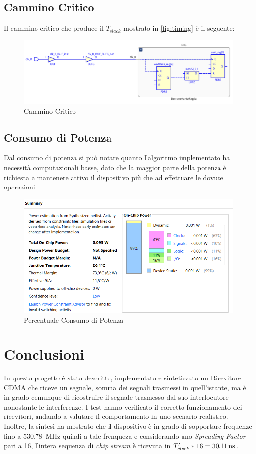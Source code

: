\documentclass[a4paper,12pt]{article}
\begin{document}
  \subsection{Cammino Critico}
    Il cammino critico che produce il $T_{slack}$ mostrato in \ref{fig:timing} è il seguente:
    \begin{figure}[H]
      \centering
      \includegraphics[width=\textwidth]{img/CamminoCritico.png}
      \caption{Cammino Critico}
      \label{fig:critico}
    \end{figure}
  \subsection{Consumo di Potenza}
    Dal consumo di potenza si può notare quanto l'algoritmo implementato ha necessità computazionali basse, dato che la 
    maggior parte della potenza è richiesta a mantenere attivo il dispositivo più che ad effettuare le dovute operazioni.
    \begin{figure}[H]
      \centering
      \includegraphics[width=\textwidth]{img/Power.png}
      \caption{Percentuale Consumo di Potenza}
      \label{fig:power}
    \end{figure}
\section{Conclusioni}
  In questo progetto è stato descritto, implementato e sintetizzato un Ricevitore CDMA che riceve un segnale, somma
  dei segnali trasmessi in quell'istante, ma è in grado comunque di ricostruire il segnale trasmesso dal suo interlocutore
  nonostante le interferenze. I test hanno verificato il corretto funzionamento dei ricevitori, andando a valutare il 
  comportamento in uno scenario realistico. Inoltre, la sintesi ha mostrato che il dispositivo è in grado di sopportare 
  frequenze fino a \SI{530.78}{\mega\hertz} quindi a tale frenqueza e considerando uno \textit{Spreading Factor} pari a 16,
  l'intera sequenza di \textit{chip stream} è ricevuta in $T'_{clock}*16 = \text{\SI{30.11}{\nano\second}}$. 
\end{document}
